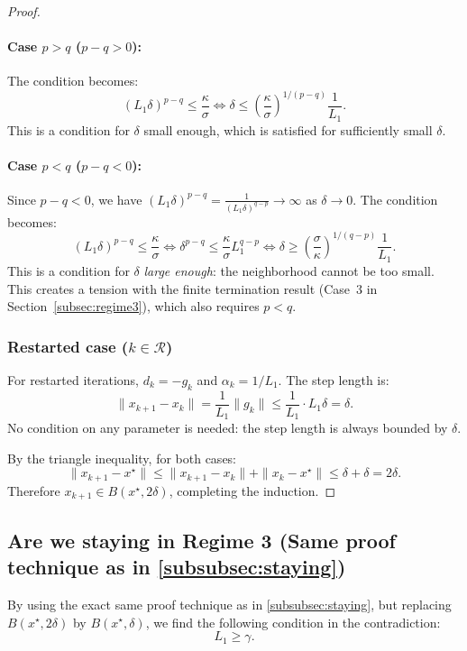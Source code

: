 \documentclass{article}
\begin{document}
\begin{proof}
\paragraph{Case $p > q$ ($p - q > 0$):} The condition becomes:
\[
(L_1\delta)^{p-q} \leq \frac{\kappa}{\sigma} \iff \delta \leq \left(\frac{\kappa}{\sigma}\right)^{1/(p-q)}\frac{1}{L_1}.
\]
This is a condition for $\delta$ small enough, which is satisfied for sufficiently small $\delta$.

\paragraph{Case $p < q$ ($p - q < 0$):} Since $p - q < 0$, we have $(L_1\delta)^{p-q} = \frac{1}{(L_1\delta)^{q-p}} \to \infty$ as $\delta \to 0$. The condition becomes:
\[
(L_1\delta)^{p-q} \leq \frac{\kappa}{\sigma} \iff \delta^{p-q} \leq \frac{\kappa}{\sigma}L_1^{q-p} \iff \delta \geq \left(\frac{\sigma}{\kappa}\right)^{1/(q-p)}\frac{1}{L_1}.
\]
This is a condition for $\delta$ \emph{large enough}: the neighborhood cannot be too small. This creates a tension with the finite termination result (Case~3 in Section~\ref{subsec:regime3}), which also requires $p < q$.

\subsubsection{Restarted case ($k \in \mathcal{R}$)}

For restarted iterations, $d_k = -g_k$ and $\alpha_k = 1/L_1$. The step length is:
\[
\|x_{k+1} - x_k\| = \frac{1}{L_1}\|g_k\| \leq \frac{1}{L_1} \cdot L_1\delta = \delta.
\]
No condition on any parameter is needed: the step length is always bounded by $\delta$.

By the triangle inequality, for both cases:
\[
\|x_{k+1} - x^\star\| \leq \|x_{k+1} - x_k\| + \|x_k - x^\star\| \leq \delta + \delta = 2\delta.
\]
Therefore $x_{k+1} \in B(x^\star, 2\delta)$, completing the induction.
\end{proof}

\subsection{Are we staying in Regime 3 (Same proof technique as in \ref{subsubsec:staying})}
By using the exact same proof technique as in \ref{subsubsec:staying}, but replacing $B(x^\star, 2\delta)$ by $B(x^\star, \delta)$, we find the following condition in the contradiction:
\begin{equation}
    L_1 \geq \gamma .
\end{equation}
\end{document}
